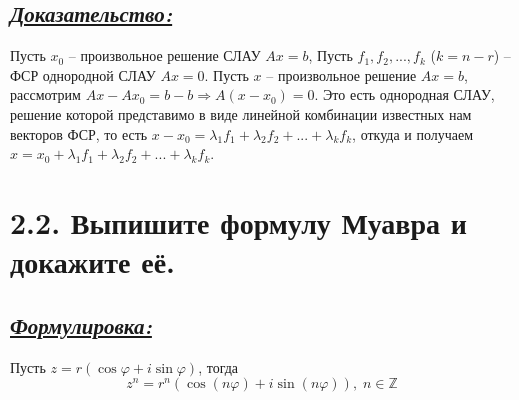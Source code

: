 \documentclass{article}
\begin{document}
\subsection*{\Large \underline{\textit{Доказательство: }}}
Пусть $x_0$ -- произвольное решение СЛАУ $Ax = b$, Пусть $f_1, f_2, ..., f_k$ ($k = n - r$) -- ФСР однородной СЛАУ $Ax = 0$. Пусть $x$ -- произвольное решение $Ax = b$, рассмотрим $Ax - Ax_0 = b - b \Rightarrow A(x - x_0) = 0$. Это есть однородная СЛАУ, решение которой представимо в виде линейной комбинации известных нам векторов ФСР, то есть $x - x_0 = \lambda_1f_1 + \lambda_2f_2 + ... + \lambda_kf_k$, откуда и получаем $x = x_0 + \lambda_1f_1 + \lambda_2f_2 + ... + \lambda_kf_k$.

\section*{\LARGE 2.2. Выпишите формулу Муавра и докажите её. }
\subsection*{\Large \underline{\textit{Формулировка: }}}
Пусть $z = r(\cos{\varphi} + i\sin{\varphi})$, тогда
$$ z^n =  r^n(\cos{(n\varphi)} + i\sin{(n\varphi)}),\; n \in \mathbb{Z}$$
\end{document}
